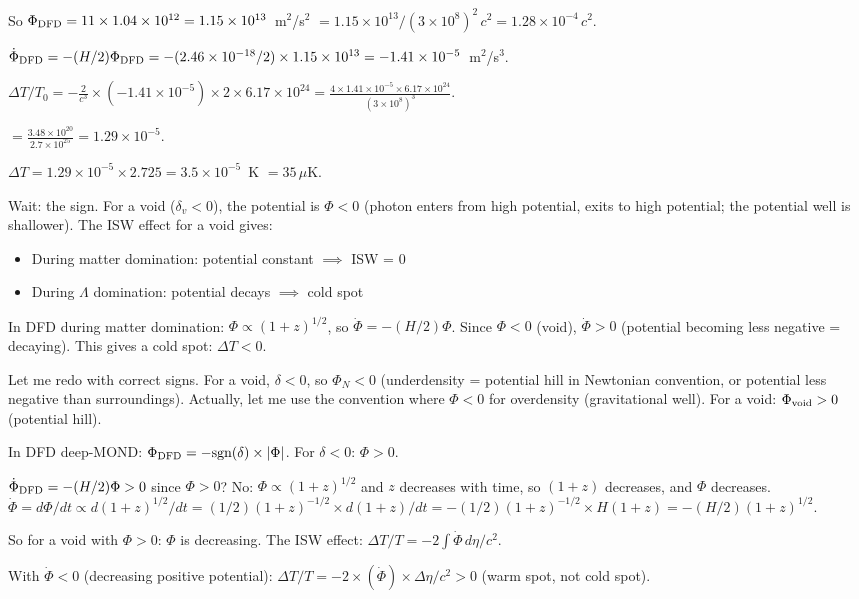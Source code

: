 \documentclass[11pt]{article}
\newcommand{\ee}[1]{\times 10^{#1}}
\begin{document}
So $\Phi_{\rm DFD} = 11\times 1.04\ee{12} = 1.15\ee{13}$~m$^2$/s$^2$
$= 1.15\ee{13}/(3\ee{8})^2\,c^2 = 1.28\ee{-4}\,c^2$.

$\dot\Phi_{\rm DFD} = -(H/2)\Phi_{\rm DFD}
= -(2.46\ee{-18}/2)\times 1.15\ee{13}
= -1.41\ee{-5}$~m$^2$/s$^3$.

$\Delta T/T_0 = -\frac{2}{c^3}\times(-1.41\ee{-5})\times
2\times 6.17\ee{24}
= \frac{4\times 1.41\ee{-5}\times 6.17\ee{24}}{(3\ee{8})^3}$.

$= \frac{3.48\ee{20}}{2.7\ee{25}} = 1.29\ee{-5}$.

$\Delta T = 1.29\ee{-5}\times 2.725 = 3.5\ee{-5}$~K $= 35\,\mu$K.

Wait: the sign. For a void ($\delta_v < 0$), the potential is
$\Phi < 0$ (photon enters from high potential, exits to high
potential; the potential well is shallower). The ISW effect for a
void gives:
\begin{itemize}
\item During matter domination: potential constant $\implies$ ISW = 0
\item During $\Lambda$ domination: potential decays $\implies$ cold spot
\end{itemize}

In DFD during matter domination: $\Phi \propto (1+z)^{1/2}$, so
$\dot\Phi = -(H/2)\Phi$. Since $\Phi < 0$ (void), $\dot\Phi > 0$
(potential becoming less negative = decaying). This gives a cold spot:
$\Delta T < 0$.

Let me redo with correct signs. For a void, $\delta < 0$, so
$\Phi_N < 0$ (underdensity = potential hill in Newtonian convention,
or potential less negative than surroundings). Actually, let me use
the convention where $\Phi < 0$ for overdensity (gravitational well).
For a void: $\Phi_{\rm void} > 0$ (potential hill).

In DFD deep-MOND:
$\Phi_{\rm DFD} = -\text{sgn}(\delta)\times|\Phi|$.
For $\delta < 0$: $\Phi > 0$.

$\dot\Phi_{\rm DFD} = -(H/2)\Phi > 0$ since $\Phi > 0$? No:
$\Phi \propto (1+z)^{1/2}$ and $z$ decreases with time, so
$(1+z)$ decreases, and $\Phi$ decreases.
$\dot\Phi = d\Phi/dt \propto d(1+z)^{1/2}/dt
= (1/2)(1+z)^{-1/2}\times d(1+z)/dt
= -(1/2)(1+z)^{-1/2}\times H(1+z) = -(H/2)(1+z)^{1/2}$.

So for a void with $\Phi > 0$: $\Phi$ is decreasing. The ISW effect:
$\Delta T/T = -2\int\dot\Phi\,d\eta/c^2$.

With $\dot\Phi < 0$ (decreasing positive potential):
$\Delta T/T = -2\times(\dot\Phi)\times\Delta\eta/c^2 > 0$
(warm spot, not cold spot).
\end{document}
